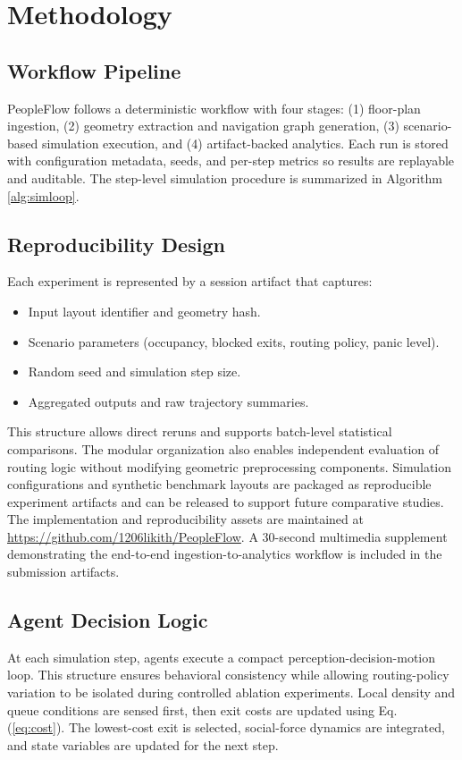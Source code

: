 \documentclass[journal]{IEEEtran}
\begin{document}
\section{Methodology}
\subsection{Workflow Pipeline}
PeopleFlow follows a deterministic workflow with four stages: (1) floor-plan ingestion, (2) geometry extraction and navigation graph generation, (3) scenario-based simulation execution, and (4) artifact-backed analytics. Each run is stored with configuration metadata, seeds, and per-step metrics so results are replayable and auditable. The step-level simulation procedure is summarized in Algorithm \ref{alg:simloop}.

\subsection{Reproducibility Design}
Each experiment is represented by a session artifact that captures:
\begin{itemize}
    \item Input layout identifier and geometry hash.
    \item Scenario parameters (occupancy, blocked exits, routing policy, panic level).
    \item Random seed and simulation step size.
    \item Aggregated outputs and raw trajectory summaries.
\end{itemize}
This structure allows direct reruns and supports batch-level statistical comparisons. The modular organization also enables independent evaluation of routing logic without modifying geometric preprocessing components. Simulation configurations and synthetic benchmark layouts are packaged as reproducible experiment artifacts and can be released to support future comparative studies. The implementation and reproducibility assets are maintained at \url{https://github.com/1206likith/PeopleFlow}.
A 30-second multimedia supplement demonstrating the end-to-end ingestion-to-analytics workflow is included in the submission artifacts.

\subsection{Agent Decision Logic}
At each simulation step, agents execute a compact perception-decision-motion loop. This structure ensures behavioral consistency while allowing routing-policy variation to be isolated during controlled ablation experiments. Local density and queue conditions are sensed first, then exit costs are updated using Eq. (\ref{eq:cost}). The lowest-cost exit is selected, social-force dynamics are integrated, and state variables are updated for the next step.
\end{document}
